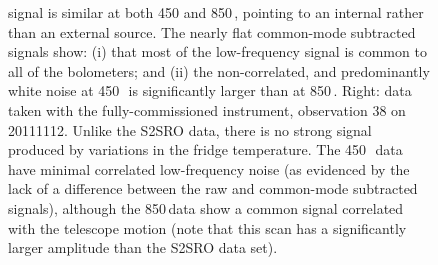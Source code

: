 \documentclass[useAMS,usenatbib,nofootinbib]{mn2e}
\begin{document}
\begin{figure}
{  signal is similar at both 450 and 850\,\micron, pointing to an
  internal rather than an external source.  The nearly flat
  common-mode subtracted signals show: (i) that most of the
  low-frequency signal is common to all of the bolometers; and (ii)
  the non-correlated, and predominantly white noise at 450\,\micron\
  is significantly larger than at 850\,\micron. Right: data taken with
  the fully-commissioned instrument, observation 38 on
  20111112. Unlike the S2SRO data, there is no strong signal produced
  by variations in the fridge temperature. The 450\,\micron\ data have
  minimal correlated low-frequency noise (as evidenced by the lack of
  a difference between the raw and common-mode subtracted signals),
  although the 850\,\micron data show a common signal correlated with
  the telescope motion (note that this scan has a significantly larger
  amplitude than the S2SRO data set).}
\label{fig:bolos_mix}
\end{figure}
\end{document}
